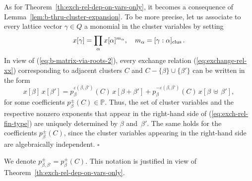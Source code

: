 \documentclass[letterpaper]{amsart}
\numberwithin{equation}{section}
\theoremstyle{definition}
\def\endproof{\hfill$\square$\medskip}
\def\PP{\mathbb{P}}
\def\subplus{{\,\uplus\,} }
\begin{document}
As for Theorem~\ref{th:exch-rel-dep-on-vars-only}, it 
becomes a consequence of 
Lemma~\ref{lem:b-thru-cluster-expansion}. 
To be more precise, let us associate to every lattice vector $\gamma \in Q$ 
a monomial in the cluster variables by setting 
\[ 
x[\gamma] = \prod_\alpha x[\alpha]^{m_\alpha}, \quad 
m_\alpha = [\gamma : \alpha]_{\rm clus} \, . 
\] 
In view of (\ref{eq:b-matrix-via-roots-2}), 
every exchange relation (\ref{eq:exchange-rel-xx}) 
corresponding to adjacent clusters 
$C$ and $C-\{\beta\}\cup\{\beta'\}$ 
can be written in the form 
\begin{equation} 
\label{eq:exch-rel-fin-type} 
x[\beta]\, x[\beta'] = 
p^{\varepsilon(\beta,\beta')}_{\beta} (C) \, x[\beta+\beta'] + 
p^{-\varepsilon(\beta,\beta')}_{\beta}(C) \, x[\beta \subplus \beta'], 
\end{equation} 
for some coefficients $p^{\pm}_{\beta} (C) \in \PP$. 
Thus, the set of cluster variables and the respective nonzero 
exponents that appear in the right-hand 
side of (\ref{eq:exch-rel-fin-type}) 
are uniquely determined by $\beta$ and~$\beta'$. 
The same holds for the coefficients $p^{\pm}_{\beta} (C)$, 
since the cluster variables appearing in the right-hand 
side are algebraically independent. 
\endproof 
 
We denote $p^\pm_{\beta,\beta'}=p^{\pm}_{\beta} (C)$. 
This notation is justified in view of 
Theorem~\ref{th:exch-rel-dep-on-vars-only}. 
 
\end{document}
